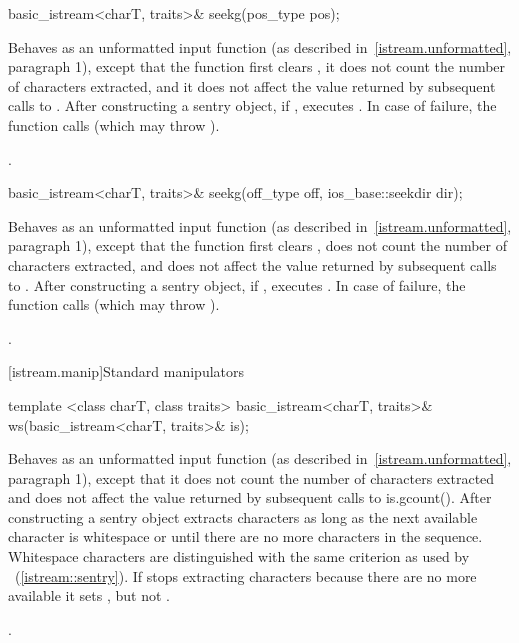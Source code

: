 %
\begin{itemdecl}
basic_istream<charT, traits>& seekg(pos_type pos);
\end{itemdecl}

\begin{itemdescr}
\pnum
\effects
Behaves as an unformatted input function (as described in~\ref{istream.unformatted}, paragraph 1), except that
the function first clears ,
it does not count
the number of characters extracted, and it does not affect the value
returned by subsequent calls to
.
After constructing a sentry object, if
,
executes
.
In case of failure, the function calls
(which may throw
).

\pnum
\returns
{}.
\end{itemdescr}

%
\begin{itemdecl}
basic_istream<charT, traits>& seekg(off_type off, ios_base::seekdir dir);
\end{itemdecl}

\begin{itemdescr}
\pnum
\effects
Behaves as an unformatted input function (as described in~\ref{istream.unformatted}, paragraph
1), except that the function first clears ,
does not count the number of characters extracted, and
does not affect the value returned by subsequent calls to .
After constructing a sentry object, if
,
executes
.
In case of failure, the function calls  (which may throw
).

\pnum
\returns
{}.
\end{itemdescr}

[istream.manip]{Standard  manipulators}

%
\begin{itemdecl}
template <class charT, class traits>
  basic_istream<charT, traits>& ws(basic_istream<charT, traits>& is);
\end{itemdecl}

\begin{itemdescr}
\pnum
\effects
Behaves as an unformatted input function (as described in~\ref{istream.unformatted},
paragraph 1), except that it does not count the number of characters extracted and
does not affect the value returned by subsequent calls to is.gcount(). After
constructing a sentry object extracts characters as long as the next available
character  is whitespace or until there are no more characters in the sequence.
Whitespace characters are distinguished with the same criterion as used by
~(\ref{istream::sentry}).
If
stops extracting characters because there are no more available it sets
,
but not
.

\pnum
\returns
{}.
\end{itemdescr}

